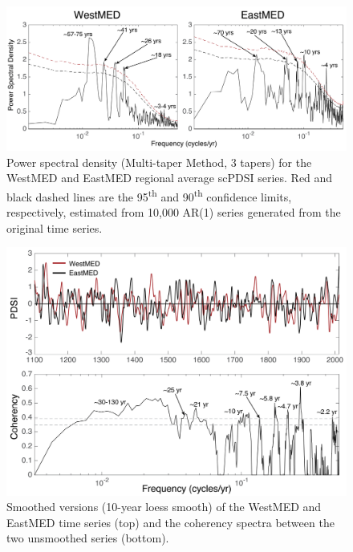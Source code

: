 \documentclass[draft,jgr]{AGUTeX}
\begin{document}
\begin{figure}
\center
\includegraphics[width=1.0\columnwidth]{fig_08_eastwest_mtm_spectra.png}
\caption{Power spectral density (Multi-taper Method, 3 tapers) for the WestMED and EastMED regional average scPDSI series. Red and black dashed lines are the 95\textsuperscript{th} and 90\textsuperscript{th} confidence limits, respectively, estimated from 10,000 AR(1) series generated from the original time series.}\label{placeholder}
\end{figure}

\begin{figure}
\center
\includegraphics[width=0.9\columnwidth]{fig_09_eastwest_cohere.png}
\caption{Smoothed versions (10-year loess smooth) of the WestMED and EastMED time series (top) and the coherency spectra between the two unsmoothed series (bottom).}\label{placeholder}
\end{figure}
\end{document}

